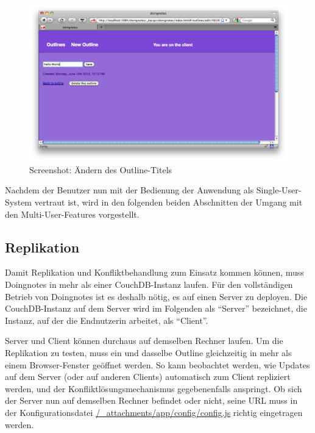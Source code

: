 \medskip
\begin{figure}[ht] 
  \begin{center}
    \includegraphics[width=\textwidth]{grafik/screenshot-edit-outline} 
  \end{center}
  \caption{Screenshot: Ändern des Outline-Titels}
  \label{fig:edit-outline} 
\end{figure}

Nachdem der Benutzer nun mit der Bedienung der Anwendung als Single-User-System vertraut ist, wird in den folgenden beiden Abschnitten der Umgang mit den Multi-User-Features vorgestellt.


\subsection{Replikation}

Damit Replikation und Konfliktbehandlung zum Einsatz kommen können, muss Doingnotes in mehr als einer CouchDB-Instanz laufen. Für den vollständigen Betrieb von Doingnotes ist es deshalb nötig, es auf einen Server zu deployen. Die CouchDB-Instanz auf dem Server wird im Folgenden als \enquote{Server} bezeichnet, die Instanz, auf der die Endnutzerin arbeitet, als \enquote{Client}.

Server und Client können durchaus auf demselben Rechner laufen. Um die Replikation zu testen, muss ein und dasselbe Outline gleichzeitig in mehr als einem Browser-Fenster geöffnet werden. So kann beobachtet werden, wie Updates auf dem Server (oder auf anderen Clients) automatisch zum Client repliziert werden, und der Konfliktlösungsmechanismus gegebenenfalls anspringt. Ob sich der Server nun auf demselben Rechner befindet oder nicht, seine URL muss in der Konfigurationsdatei {\url{/\_attachments/app/config/config.js}} richtig eingetragen werden.

